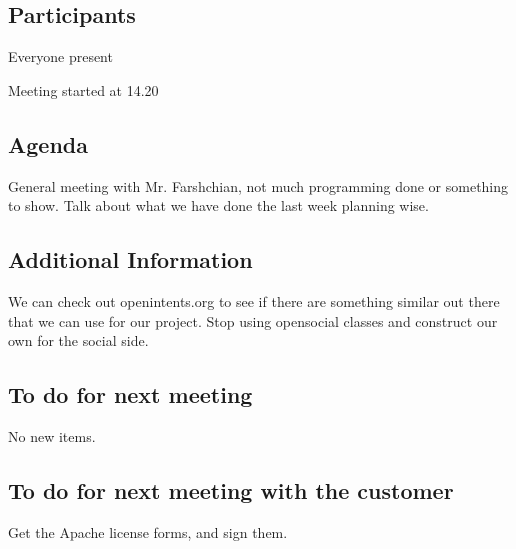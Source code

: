 \subsection{Participants}
Everyone present

Meeting started at 14.20

\subsection{Agenda}
General meeting with Mr. Farshchian, not much programming done or something to show. Talk about what we have done the last week planning wise.

\subsection{Additional Information}
We can check out openintents.org to see if there are something similar out there that we can use for our project.
Stop using opensocial classes and construct our own for the social side.

\subsection{To do for next meeting}
No new items.

\subsection{To do for next meeting with the customer}
Get the Apache license forms, and sign them.